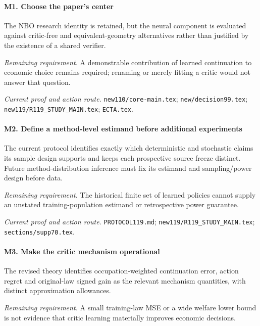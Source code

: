 \paragraph{M1. Choose the paper's center}

The NBO research identity is retained, but the neural component is evaluated against critic-free and equivalent-geometry alternatives rather than justified by the existence of a shared verifier.

\par\emph{Remaining requirement.} A demonstrable contribution of learned continuation to economic choice remains required; renaming or merely fitting a critic would not answer that question.

\par\emph{Current proof and action route.} \nolinkurl{new110/core-main.tex}; \nolinkurl{new/decision99.tex}; \nolinkurl{new119/R119_STUDY_MAIN.tex}; \nolinkurl{ECTA.tex}.

\paragraph{M2. Define a method-level estimand before additional experiments}

The current protocol identifies exactly which deterministic and stochastic claims its sample design supports and keeps each prospective source freeze distinct. Future method-distribution inference must fix its estimand and sampling/\allowbreak{}power design before data.

\par\emph{Remaining requirement.} The historical finite set of learned policies cannot supply an unstated training-population estimand or retrospective power guarantee.

\par\emph{Current proof and action route.} \nolinkurl{PROTOCOL119.md}; \nolinkurl{new119/R119_STUDY_MAIN.tex}; \nolinkurl{sections/supp70.tex}.

\paragraph{M3. Make the critic mechanism operational}

The revised theory identifies occupation-weighted continuation error, action regret and original-law signed gain as the relevant mechanism quantities, with distinct approximation allowances.

\par\emph{Remaining requirement.} A small training-law MSE or a wide welfare lower bound is not evidence that critic learning materially improves economic decisions.

